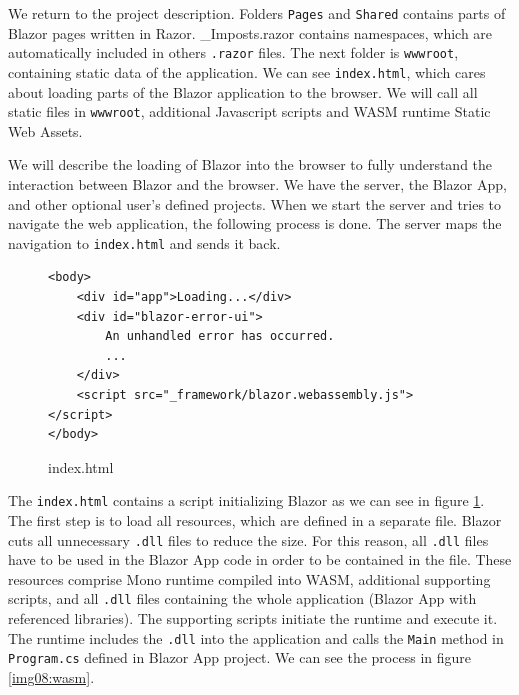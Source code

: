 \par
We return to the project description. 
Folders \texttt{Pages} and \texttt{Shared} contains parts of Blazor pages written in Razor.
\_Imposts.razor contains namespaces, which are automatically included in others \texttt{.razor} files.
The next folder is \texttt{wwwroot}, containing static data of the application.
We can see \texttt{index.html}, which cares about loading parts of the Blazor application to the browser.
We will call all static files in \texttt{wwwroot}, additional Javascript scripts and WASM runtime Static Web Assets.
\par
We will describe the loading of Blazor into the browser to fully understand the interaction between Blazor and the browser.
We have the server, the Blazor App, and other optional user's defined projects. 
When we start the server and tries to navigate the web application, the following process is done.
The server maps the navigation to \texttt{index.html} and sends it back.
\par
\begin{figure}
\begin{lstlisting}
<body>
    <div id="app">Loading...</div>
    <div id="blazor-error-ui">
        An unhandled error has occurred.
		...
    </div>
    <script src="_framework/blazor.webassembly.js"></script>
</body>

\end{lstlisting}
\caption{index.html}
\label{img07:index}
\end{figure}
\par 
The \texttt{index.html} contains a script initializing Blazor as we can see in figure \ref{img07:index}.
The first step is to load all resources, which are defined in a separate file.
Blazor cuts all unnecessary \texttt{.dll} files to reduce the size.
For this reason, all \texttt{.dll} files have to be used in the Blazor App code in order to be contained in the file. 
These resources comprise Mono runtime compiled into WASM, additional supporting scripts, and all \texttt{.dll} files containing the whole application (Blazor App with referenced libraries).
The supporting scripts initiate the runtime and execute it.
The runtime includes the \texttt{.dll} into the application and calls the \texttt{Main} method in \texttt{Program.cs} defined in Blazor App project.
We can see the process in figure \ref{img08:wasm}.
\par

